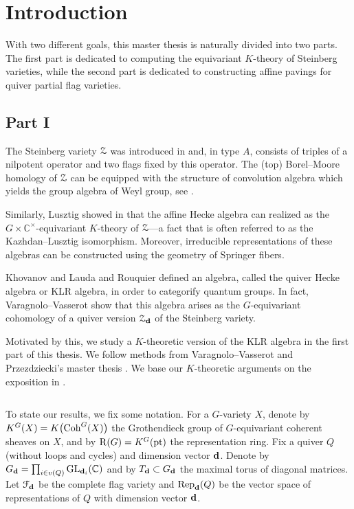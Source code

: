 \chapter*{Introduction}

With two different goals, this master thesis is naturally divided into two parts. The first part is dedicated to computing the equivariant $K$-theory of Steinberg varieties, while the second part is dedicated to constructing affine pavings for quiver partial flag varieties.

\section*{Part I}

The Steinberg variety $\operatorname{\mathcal{Z}}$ was introduced in \cite{steinberg1976desingularization} and, in type $A$, consists of triples of a nilpotent operator and two flags fixed by this operator. The (top) Borel--Moore homology of $\operatorname{\mathcal{Z}}$ can be equipped with the structure of convolution algebra which yields the group algebra of Weyl group, see \cite{kazhdan1980topological}.
 
Similarly, Lusztig showed in \cite{lusztig1985equivariant} that the affine Hecke algebra can realized as the $G \times \mathbb{C}^{\times}$-equivariant $K$-theory of $\operatorname{\mathcal{Z}}$—a fact that is often referred to as the Kazhdan–Lusztig isomorphism. Moreover, irreducible representations of these algebras can be constructed using the geometry of Springer fibers.

Khovanov and Lauda \cite{https://doi.org/10.48550/arxiv.0803.4121} and Rouquier \cite{https://doi.org/10.48550/arxiv.0812.5023} defined an algebra, called the quiver Hecke algebra or KLR algebra, in order to categorify quantum groups. In fact, Varagnolo--Vasserot \cite{varagnolo2011canonical} show that this algebra arises as the $G$-equivariant cohomology of a quiver version $\operatorname{\mathcal{Z}}_{\mathbf{d}}$ of the Steinberg variety.

Motivated by this, we study a $K$-theoretic version of the KLR algebra in the first part of this thesis. We follow methods from Varagnolo--Vasserot \cite{varagnolo2011canonical} and Przezdziecki’s master thesis \cite{przezdziecki2015geometric}. We base our $K$-theoretic arguments on the exposition in \cite[Chapter 5]{chriss1997representation}.

$\,$

To state our results, we fix some notation. For a $G$-variety $X$, denote by $K^G(X)=K\big(\!\operatorname{\operatorname{Coh}}^G(X)\big)$ the Grothendieck group of $G$-equivariant coherent sheaves on $X$, and by $\operatorname{\operatorname{R}}(G)=K^G(\operatorname{\operatorname{pt}})$ the representation ring. Fix a quiver $Q$ (without loops and cycles) and dimension vector $\mathbf{d}$. Denote by $G_{\mathbf{d}}=\prod_{i \in v(Q)} \operatorname{\operatorname{GL}}_{\mathbf{d}_i}(\mathbb{C})$ and by $T_{\mathbf{d}} \subset G_{\mathbf{d}}$ the maximal torus of diagonal matrices. Let $\mathcal{F}_{\mathbf{d}}$ be the complete flag variety and $\operatorname{\operatorname{Rep}}_{\mathbf{d}}(Q)$ be the vector space of representations of $Q$ with dimension vector $\mathbf{d}$.

